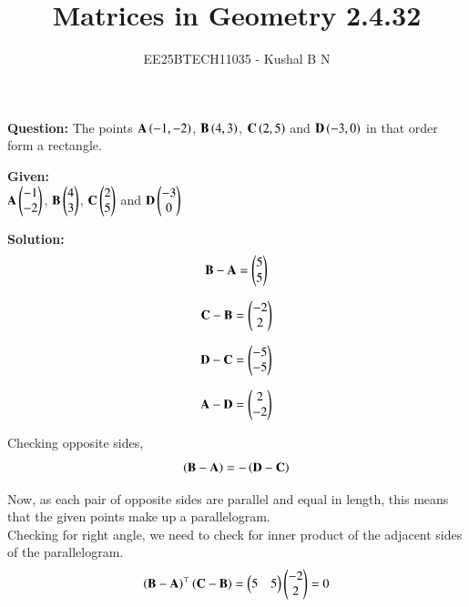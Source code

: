 \documentclass[journal,12pt,onecolumn]{IEEEtran}
\title{Matrices in Geometry 2.4.32}
\author{EE25BTECH11035 - Kushal B N}
\theoremstyle{remark}
\begin{document}
\vspace{3cm}
\maketitle
{\let\newpage\relax\maketitle}
\textbf{Question: }
The points $\mathbf{A}\left(-1,-2\right)$, $\mathbf{B}\left(4,3\right)$, $\mathbf{C}\left(2,5\right)$ and $\mathbf{D}\left(-3,0\right)$ in that order form a rectangle.

\textbf{Given: } \\
$\mathbf{A}\begin{pmatrix}-1\\-2\end{pmatrix}$, $\mathbf{B}\begin{pmatrix}4\\3\end{pmatrix}$, $\mathbf{C}\begin{pmatrix}2\\5\end{pmatrix}$ and $\mathbf{D}\begin{pmatrix}-3\\0\end{pmatrix}$

\textbf{Solution: }\\
\begin{equation}
\mathbf{B} - \mathbf{A} = \begin{pmatrix}5\\5\end{pmatrix}
\end{equation}

\begin{equation}
\mathbf{C} - \mathbf{B} = \begin{pmatrix}-2\\2\end{pmatrix}
\end{equation}

\begin{equation}
\mathbf{D} - \mathbf{C} = \begin{pmatrix}-5\\-5\end{pmatrix}
\end{equation}

\begin{equation}
\mathbf{A} - \mathbf{D} = \begin{pmatrix}2\\-2\end{pmatrix}
\end{equation}

Checking opposite sides,\\
\begin{equation}
\left(\mathbf{B} - \mathbf{A}\right) = - \left(\mathbf{D} - \mathbf{C}\right)
\end{equation}

Now, as each pair of opposite sides are parallel and equal in length, this means that the given points make up a parallelogram.\\
Checking for right angle, we need to check for inner product of the adjacent sides of the parallelogram.\\

\begin{equation}
\left(\mathbf{B}-\mathbf{A}\right)^{\top}\left(\mathbf{C}-\mathbf{B}\right) = \begin{pmatrix}5 & 5\end{pmatrix}\begin{pmatrix}-2\\2\end{pmatrix} = 0
\end{equation}
\end{document}
